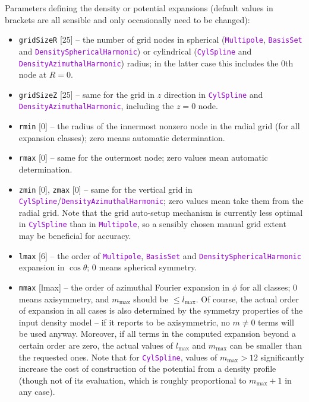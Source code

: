 \documentclass[12pt]{article}
\newcommand{\ttt}[1]{\textcolor{darkviolet}{\texttt{#1}}}
\newcommand{\ppp}[1]{\textcolor{darkolive} {\texttt{#1}}}
\begin{document}
\label   {sec:PotentialExpansionParams}
Parameters defining the density or potential expansions (default values in brackets are all sensible and only occasionally need to be changed):
\begin{itemize}
\item \ppp{gridSizeR} [25] -- the number of grid nodes in spherical (\ttt{Multipole}, \ttt{BasisSet} and \ttt{DensitySphericalHarmonic}) or cylindrical (\ttt{CylSpline} and \ttt{DensityAzimuthalHarmonic}) radius; in the latter case this includes the 0th node at $R=0$. 
\item \ppp{gridSizeZ} [25] -- same for the grid in $z$ direction in \ttt{CylSpline} and \ttt{DensityAzimuthal\-Harmonic}, including the $z=0$ node.
\item \ppp{rmin} [0] -- the radius of the innermost nonzero node in the radial grid (for all expansion classes); zero means automatic determination.
\item \ppp{rmax} [0] -- same for the outermost node; zero values mean automatic determination.
\item \ppp{zmin} [0], \ppp{zmax} [0] -- same for the vertical grid in \ttt{CylSpline}/\ttt{DensityAzimuthalHarmonic}; zero values mean take them from the radial grid. Note that the grid auto-setup mechanism is currently less optimal in \ttt{CylSpline} than in \ttt{Multipole}, so a sensibly chosen manual grid extent may be beneficial for accuracy.
\item \ppp{lmax} [6] -- the order of \ttt{Multipole}, \ttt{BasisSet} and \ttt{DensitySphericalHarmonic} expansion in $\cos\theta$; 0 means spherical symmetry. 
\item \ppp{mmax} [lmax] -- the order of azimuthal Fourier expansion in $\phi$ for all classes; 0 means axisymmetry, and $m_\mathrm{max}$ should be $\le l_\mathrm{max}$. Of course, the actual order of expansion in all cases is also determined by the symmetry properties of the input density model -- if it reports to be axisymmetric, no $m\ne 0$ terms will be used anyway. Moreover, if all terms in the computed expansion beyond a certain order are zero, the actual values of $l_\mathrm{max}$ and $m_\mathrm{max}$ can be smaller than the requested ones. Note that for \ttt{CylSpline}, values of $m_\mathrm{max}>12$ significantly increase the cost of construction of the potential from a density profile (though not of its evaluation, which is roughly proportional to $m_\mathrm{max}+1$ in any case).

\end{itemize}
\end{document}
